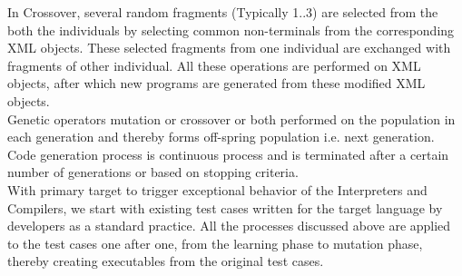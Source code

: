 \documentclass{acm_proc_article-sp}
\begin{document}
\indent In Crossover, several random fragments (Typically 1..3) are selected from the both the individuals by selecting common non-terminals from the corresponding XML objects. These selected fragments from one individual are exchanged with fragments of other individual. All these operations are performed on XML objects, after which new programs are generated from these modified XML objects.\\
\indent Genetic operators mutation or crossover or both performed on the population in each generation and thereby forms off-spring population i.e. next generation. Code generation process is continuous process and is terminated after a certain number of generations or based on stopping criteria. \\
\indent With primary target to trigger exceptional behavior of the Interpreters and Compilers, we start with existing test cases written for the target language by developers as a standard practice. All the  processes discussed above are applied to the test cases one after one, from the learning phase to mutation phase, thereby creating executables from the original test cases.
\end{document}
